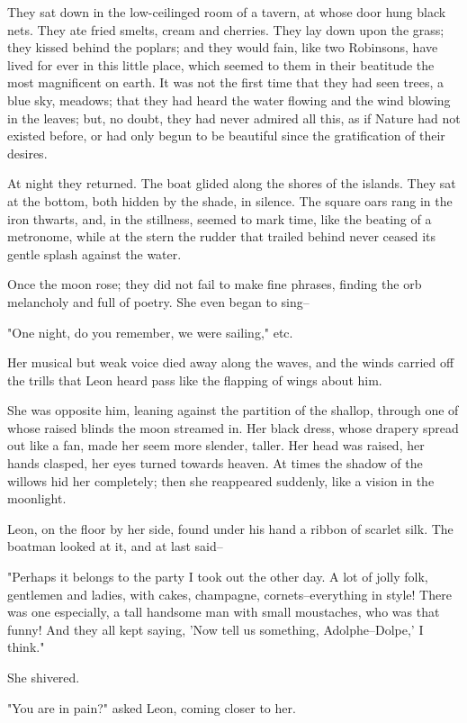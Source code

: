 \documentclass[11pt,twocolumn]{ltugboat}
\begin{document}
They sat down in the low-ceilinged room of a tavern, at whose door hung
black nets. They ate fried smelts, cream and cherries. They lay down
upon the grass; they kissed behind the poplars; and they would fain,
like two Robinsons, have lived for ever in this little place, which
seemed to them in their beatitude the most magnificent on earth. It was
not the first time that they had seen trees, a blue sky, meadows; that
they had heard the water flowing and the wind blowing in the leaves;
but, no doubt, they had never admired all this, as if Nature had
not existed before, or had only begun to be beautiful since the
gratification of their desires.

At night they returned. The boat glided along the shores of the islands.
They sat at the bottom, both hidden by the shade, in silence. The square
oars rang in the iron thwarts, and, in the stillness, seemed to mark
time, like the beating of a metronome, while at the stern the rudder
that trailed behind never ceased its gentle splash against the water.

Once the moon rose; they did not fail to make fine phrases, finding the
orb melancholy and full of poetry. She even began to sing--

"One night, do you remember, we were sailing," etc.

Her musical but weak voice died away along the waves, and the winds
carried off the trills that Leon heard pass like the flapping of wings
about him.

She was opposite him, leaning against the partition of the shallop,
through one of whose raised blinds the moon streamed in. Her black
dress, whose drapery spread out like a fan, made her seem more slender,
taller. Her head was raised, her hands clasped, her eyes turned towards
heaven. At times the shadow of the willows hid her completely; then she
reappeared suddenly, like a vision in the moonlight.

Leon, on the floor by her side, found under his hand a ribbon of scarlet
silk. The boatman looked at it, and at last said--

"Perhaps it belongs to the party I took out the other day. A lot
of jolly folk, gentlemen and ladies, with cakes, champagne,
cornets--everything in style! There was one especially, a tall handsome
man with small moustaches, who was that funny! And they all kept saying,
'Now tell us something, Adolphe--Dolpe,' I think."

She shivered.

"You are in pain?" asked Leon, coming closer to her.
\end{document}
